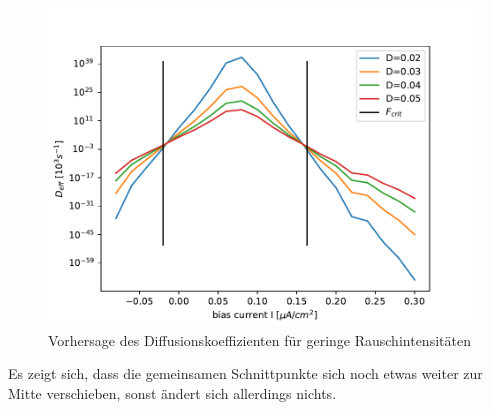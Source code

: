 \documentclass[12pt,a4paper]{article}
\begin{document}
\begin{figure}[H]
	\centering
	\includegraphics[scale=1]{deffpred.pdf}\caption{Vorhersage des Diffusionskoeffizienten für geringe Rauschintensitäten}
	\label{deffpred}
\end{figure}
Es zeigt sich, dass die gemeinsamen Schnittpunkte sich noch etwas weiter zur Mitte verschieben, sonst ändert sich allerdings nichts.
\end{document}
